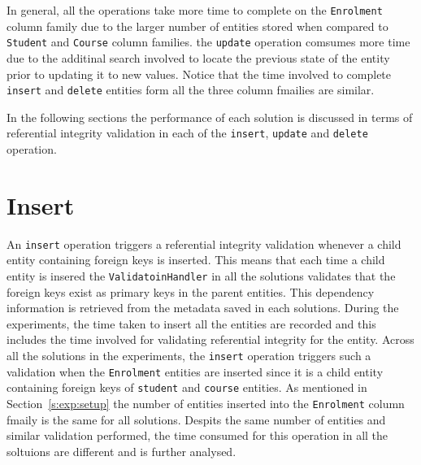 	
	
% 	

	In general, all the operations take more time to complete on the
	\texttt{Enrolment} column family due to the larger number of entities stored
	when compared to \texttt{Student} and \texttt{Course} column families. the
	\texttt{update} operation comsumes more time due to the additinal search
	involved to locate the previous state of the entity prior to updating it to new
	values. Notice that the time involved to complete \texttt{insert} and
	\texttt{delete} entities form all the three column fmailies are similar.
	
	In the following sections the performance of each solution is discussed in
	terms of referential integrity validation in each of the \texttt{insert},
	\texttt{update} and \texttt{delete} operation.
	
\section{Insert}\label{sr:insert}
An \texttt{insert} operation triggers a referential integrity validation
whenever a child entity containing foreign keys is inserted. This means that
each time a child entity is insered the \texttt{ValidatoinHandler} in all the
solutions validates that the foreign keys exist as primary keys in the parent
entities. This dependency information is retrieved from the metadata saved in
each solutions. During the experiments, the time taken to insert all the
entities are recorded and this includes the time involved for validating
referential integrity for the entity. Across all the solutions in the
experiments, the \texttt{insert} operation triggers such a validation when the
\texttt{Enrolment} entities are inserted since it is a child entity containing
foreign keys of \texttt{student} and \texttt{course} entities. As mentioned in
Section~\ref{s:exp:setup} the number of entities inserted into the
\texttt{Enrolment} column fmaily is the same for all solutions. Despits the same
number of entities and similar validation performed, the time consumed for this
operation in all the soltuions are different and is further analysed.
		
